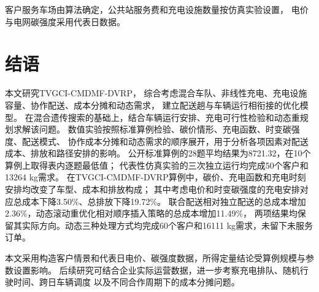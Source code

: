 \documentclass{setp-new}
\begin{document}
客户服务车场由算法确定，公共站服务费和充电设施数量按仿真实验设置，
电价与电网碳强度采用代表日数据。

\section{结语}

本文研究TVGCI-CMDMF-DVRP，
综合考虑混合车队、非线性充电、充电设施容量、协作配送、成本分摊和动态需求，
建立配送趟与车辆运行相衔接的优化模型。
在混合遗传搜索的基础上，结合车辆运行安排、充电可行性检验和动态重规划求解该问题。
数值实验按照标准算例检验、碳价情形、充电函数、时变碳强度、配送模式、
协作成本分摊和动态需求的顺序展开，用于分析各项因素对配送成本、排放和路径安排的影响。
公开标准算例的28题平均结果为8721.32，在10个算例上取得表内逐题最低值；
代表性仿真实验的三次独立运行均完成50个客户和13264 kg需求。
在TVGCI-CMDMF-DVRP算例中，碳价、充电函数和充电时刻安排均改变了车型、成本和排放构成；
其中考虑电价和时变碳强度的充电安排对应总成本下降3.50\%、总排放下降19.72\%。
联合配送相对独立配送的总成本增加2.36\%，动态滚动重优化相对顺序插入策略的总成本增加11.49\%，
两项结果均保留其实际方向。动态三种处理方式均完成60个客户和16111 kg需求，未留下未服务订单。

本文采用构造客户情景和代表日电价、碳强度数据，所得定量结论受算例规模与参数设置影响。
后续研究可结合企业实际运营数据，进一步考察充电排队、随机行驶时间、跨日车辆调度
以及不同合作周期下的成本分摊问题。
\end{document}
